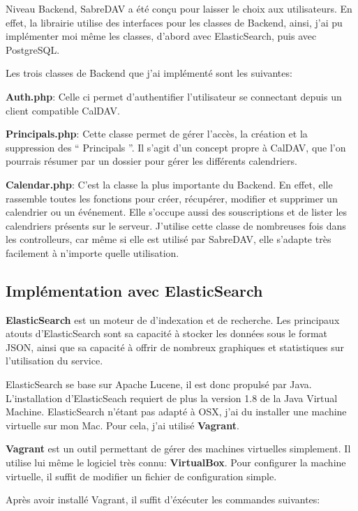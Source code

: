 Niveau Backend, SabreDAV a été conçu pour laisser le choix aux utilisateurs. En effet, la librairie utilise des interfaces pour les classes de Backend, ainsi, j'ai pu implémenter moi même les classes, d'abord avec ElasticSearch, puis avec PostgreSQL.

Les trois classes de Backend que j'ai implémenté sont les suivantes:

\textbf{Auth.php}: Celle ci permet d'authentifier l'utilisateur se connectant depuis un client compatible CalDAV.

\textbf{Principals.php}: Cette classe permet de gérer l'accès, la création et la suppression des `` Principals ''. Il s'agit d'un concept propre à CalDAV, que l'on pourrais résumer par un dossier pour gérer les différents calendriers.

\textbf{Calendar.php}: C'est la classe la plus importante du Backend. En effet, elle rassemble toutes les fonctions pour créer, récupérer, modifier et supprimer un calendrier ou un événement. Elle s'occupe aussi des souscriptions et de lister les calendriers présents sur le serveur. J'utilise cette classe de nombreuses fois dans les controlleurs, car même si elle est utilisé par SabreDAV, elle s'adapte très facilement à n'importe quelle utilisation.

\subsection{Implémentation avec ElasticSearch}

\textbf{ElasticSearch} est un moteur de d'indexation et de recherche. Les principaux atouts d'ElasticSearch sont sa capacité à stocker les données sous le format JSON, ainsi que sa capacité à offrir de nombreux graphiques et statistiques sur l'utilisation du service.

ElasticSearch se base sur Apache Lucene, il est donc propulsé par Java. L'installation d'ElasticSeach requiert de plus la version 1.8 de la Java Virtual Machine. ElasticSearch n'étant pas adapté à OSX, j'ai du installer une machine virtuelle sur mon Mac. Pour cela, j'ai utilisé \textbf{Vagrant}.

\textbf{Vagrant} est un outil permettant de gérer des machines virtuelles simplement. Il utilise lui même le logiciel très connu: \textbf{VirtualBox}. Pour configurer la machine virtuelle, il suffit de modifier un fichier de configuration simple.

Après avoir installé Vagrant, il suffit d'éxécuter les commandes suivantes:

